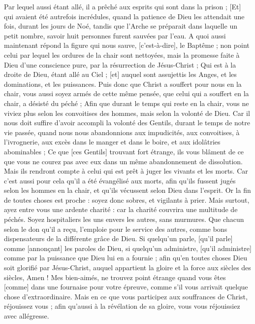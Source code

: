 \begin{multicols}{2}
Par lequel aussi étant allé, il a prêché aux esprits qui sont dans la prison ;
[Et] qui avaient été autrefois incrédules, quand la patience de Dieu les attendait une fois, durant les jours de Noé, tandis que l'Arche se préparait dans laquelle un petit nombre, savoir huit personnes furent sauvées par l'eau.
A quoi aussi maintenant répond la figure qui nous sauve, [c'est-à-dire], le Baptême ; non point celui par lequel les ordures de la chair sont nettoyées, mais la promesse faite à Dieu d'une conscience pure, par la résurrection de Jésus-Christ ;
Qui est à la droite de Dieu, étant allé au Ciel ; [et] auquel sont assujettis les Anges, et les dominations, et les puissances.
\VerseOne{}Puis donc que Christ a souffert pour nous en la chair, vous aussi soyez armés de cette même pensée, que celui qui a souffert en la chair, a désisté du péché ;
Afin que durant le temps qui reste en la chair, vous ne viviez plus selon les convoitises des hommes, mais selon la volonté de Dieu.
Car il nous doit suffire d'avoir accompli la volonté des Gentils, durant le temps de notre vie passée, quand nous nous abandonnions aux impudicités, aux convoitises, à l'ivrognerie, aux excès dans le manger et dans le boire, et aux idolâtries abominables ;
Ce que [ces Gentils] trouvant fort étrange, ils vous blâment de ce que vous ne courez pas avec eux dans un même abandonnement de dissolution.
Mais ils rendront compte à celui qui est prêt à juger les vivants et les morts.
Car c'est aussi pour cela qu'il a été évangélisé aux morts, afin qu'ils fussent jugés selon les hommes en la chair, et qu'ils vécussent selon Dieu dans l'esprit.
Or la fin de toutes choses est proche : soyez donc sobres, et vigilants à prier.
Mais surtout, ayez entre vous une ardente charité : car la charité couvrira une multitude de péchés.
Soyez hospitaliers les uns envers les autres, sans murmures.
Que chacun selon le don qu'il a reçu, l'emploie pour le service des autres, comme bons dispensateurs de la différente grâce de Dieu.
Si quelqu'un parle, [qu'il parle] comme [annonçant] les paroles de Dieu, si quelqu'un administre, [qu'il administre] comme par la puissance que Dieu lui en a fournie ; afin qu'en toutes choses Dieu soit glorifié par Jésus-Christ, auquel appartient la gloire et la force aux siècles des siècles, Amen !
Mes bien-aimés, ne trouvez point étrange quand vous êtes [comme] dans une fournaise pour votre épreuve, comme s'il vous arrivait quelque chose d'extraordinaire.
Mais en ce que vous participez aux souffrances de Christ, réjouissez vous ; afin qu'aussi à la révélation de sa gloire, vous vous réjouissiez avec allégresse.

\end{multicols}
